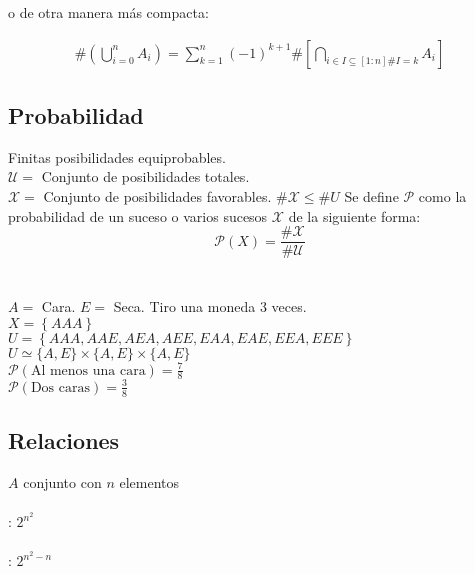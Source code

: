 \documentclass[a4paper,10pt]{article}
\begin{document}
o de otra manera más compacta: 

\begin{equation}
   \begin{split}
  \#\left(\bigcup_{i=0}^{n} {A_i}\right) = \sum_{k=1}^{n} { { \left( -1 \right) }^{k+1} \# \left[ \bigcap_{i \in I \subseteq \left[ 1:n \right] \# I = k } {A_i} \right] }
   \end{split}
\end{equation}


\subsection{Probabilidad}


Finitas posibilidades equiprobables. \\
$\mathcal{U} = $ Conjunto de posibilidades totales. \\
$\mathcal{X} = $ Conjunto de posibilidades favorables. $\# \mathcal{X} \leq \# U$
Se define $\mathcal{P}$ como la probabilidad de un suceso o varios sucesos $\mathcal{X}$ de la siguiente forma:\\
$$ \mathcal{P}(X) = \frac{\# \mathcal{X}}{\#\mathcal{U}} $$ \\

\ejemplo \\
$A = $ Cara. $E = $ Seca.
Tiro una moneda 3 veces. \\ $X = \left\{AAA\right\}$ \\ $U = \left\{AAA,AAE,AEA,AEE,EAA,EAE,EEA,EEE\right\}$ \\ $U \simeq \{A,E\} \times \{A,E\} \times \{A,E\}$ \\ $\mathcal{P}(\mbox{Al menos una cara})=\frac{7}{8}$ \\ $\mathcal{P}(\mbox{Dos caras}) = \frac {3}{8} $


\subsection{Relaciones}

$A$ conjunto con $n$ elementos \\ \\

: $2^{n^{2}}$ \\ \\

: $2^{n^{2}-n}$ \\ \\
\end{document}
